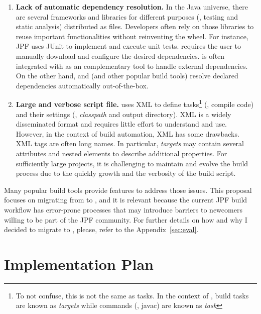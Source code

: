 \documentclass[a4paper]{article}
\begin{document}
\begin{enumerate}

\item \textbf{Lack of automatic dependency resolution.}
In the Java universe, there are several frameworks and libraries for different
purposes (\eg, testing and static analysis) distributed as \jar{} files.
Developers often rely on those libraries to reuse important functionalities
without reinventing the wheel.
For instance, JPF uses JUnit to implement and execute unit tests.
\ant{} requires the user to manually download and configure the desired
dependencies.
\ant{} is often integrated with \ivy{}\cite{page:ivy} as an complementary
tool to handle external dependencies.
On the other hand, \gradle{} and \maven{} (and other popular build tools)
resolve declared dependencies automatically out-of-the-box.

\item \textbf{Large and verbose script file.}
\ant{} uses XML to define tasks\footnote{To not confuse, this is not the same
as \ant{} tasks. In the context of \ant{}, build tasks are known as
\emph{targets} while commands (\eg, javac) are known as \emph{task}} (\eg,
compile code) and their settings (\eg, \emph{classpath} and output directory).
XML is a widely disseminated format and requires little effort to understand
and use.
However, in the context of build automation, XML has some drawbacks.
XML tags are often long names.
In particular, \ant{} \emph{targets} may contain several attributes and nested
elements to describe additional properties.
For sufficiently large projects, it is challenging to maintain and evolve the
build process due to the quickly growth and the verbosity of the build script.

\end{enumerate}

Many popular build tools provide features to address those issues.
This proposal focuses on migrating from \ant{} to \gradle{}, and it is relevant
because the current JPF build workflow has error-prone processes that may
introduce barriers to newcomers willing to be part of the JPF community.
For further details on how and why I decided to migrate to \gradle{}, please,
refer to the Appendix~\ref{sec:eval}.

\section{Implementation Plan}
\label{sec:plan}
\end{document}
